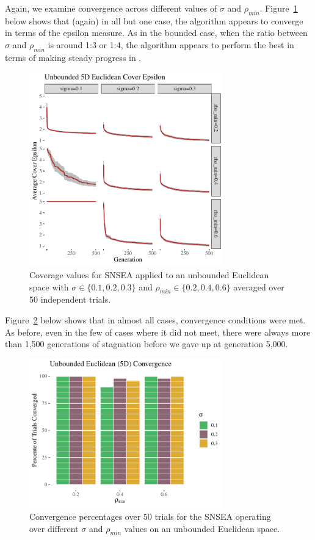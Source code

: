 \documentclass[twoside]{article}
\begin{document}
Again, we examine  convergence across different values of $\sigma$ and $\rho_{min}$.  Figure~\ref{fig:unbounded:nopop:sm} below shows that (again) in all but one case, the algorithm appears to converge in terms of the  epsilon measure.  As in the bounded case, when the ratio between $\sigma$ and $\rho_{min}$ is around 1:3 or 1:4, the algorithm appears to perform the best in terms of making steady progress in .  
%
\begin{figure}[ht]
  \center\includegraphics[width=0.75\textwidth]{Figures/unbounded-500sm-NOPOP.pdf}
  \caption{\label{fig:unbounded:nopop:sm} Coverage values for SNSEA applied to an unbounded Euclidean space with $\sigma\in\{0.1, 0.2, 0.3\}$ and $\rho_{min} \in \{0.2, 0.4, 0.6\}$ averaged over 50 independent trials.}
\end{figure}

Figure~\ref{fig:bounded:nopop:conv} below shows that in almost all cases, convergence conditions were met.  As before, even in the few of cases where it did not meet, there were always more than 1,500 generations of stagnation before we gave up at generation 5,000.  
%
\begin{figure}[ht]
  \center\includegraphics[width=0.75\textwidth]{Figures/unbounded-conv-NOPOP.pdf}
  \caption{\label{fig:bounded:nopop:conv} Convergence percentages over 50 trials for the SNSEA operating over different $\sigma$ and $\rho_{min}$ values on an unbounded Euclidean space.}
\end{figure}
\end{document}
